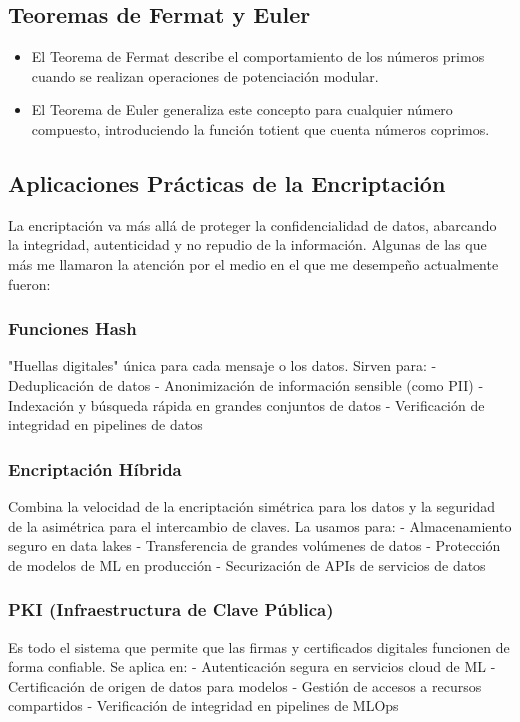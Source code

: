 \documentclass{article}
\begin{document}
    \subsection{Teoremas de Fermat y Euler}
        \begin{itemize}
            \item El Teorema de Fermat describe el comportamiento de los números primos cuando 
            se realizan operaciones de potenciación modular. 
            \item El Teorema de Euler generaliza este concepto para cualquier número compuesto, introduciendo la función totient que cuenta 
            números coprimos. 
        \end{itemize}
    
    \subsection{Aplicaciones Prácticas de la Encriptación}
        La encriptación va más allá de proteger la confidencialidad de datos, abarcando la 
        integridad, autenticidad y no repudio de la información. Algunas de las que más me llamaron
        la atención por el medio en el que me desempeño actualmente fueron:
        \subsubsection{Funciones Hash}
        "Huellas digitales" única para cada mensaje o los datos. Sirven para:
        - Deduplicación de datos
        - Anonimización de información sensible (como PII)
        - Indexación y búsqueda rápida en grandes conjuntos de datos
        - Verificación de integridad en pipelines de datos
        
        \subsubsection{Encriptación Híbrida}
        Combina la velocidad de la encriptación simétrica para los datos y la seguridad de la 
        asimétrica para el intercambio de claves. La usamos para:
        - Almacenamiento seguro en data lakes
        - Transferencia de grandes volúmenes de datos
        - Protección de modelos de ML en producción
        - Securización de APIs de servicios de datos
        
        \subsubsection{PKI (Infraestructura de Clave Pública)}
        Es todo el sistema que permite que las firmas y certificados digitales funcionen de 
        forma confiable. Se aplica en:
        - Autenticación segura en servicios cloud de ML
        - Certificación de origen de datos para modelos
        - Gestión de accesos a recursos compartidos
        - Verificación de integridad en pipelines de MLOps
\end{document}
